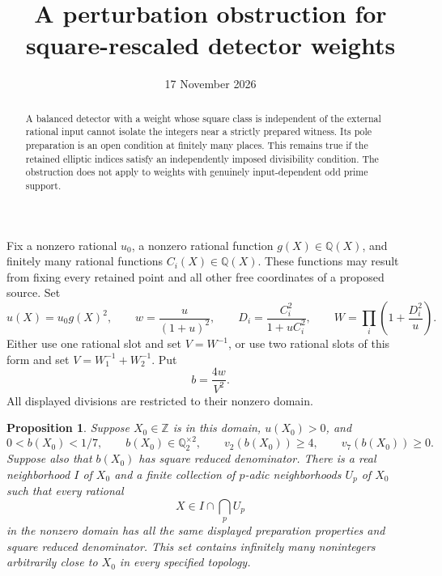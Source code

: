 \documentclass[11pt,a4paper]{article}
\title{A perturbation obstruction for square-rescaled detector weights}
\author{}\date{17 November 2026}
\newtheorem{proposition}{Proposition}
\newcommand{\Q}{\mathbb Q}
\newcommand{\Z}{\mathbb Z}
\begin{document}
\maketitle

\begin{abstract}
A balanced detector with a weight whose square class is independent of
the external rational input cannot isolate the integers near a strictly
prepared witness. Its pole preparation is an open condition at finitely
many places. This remains true if the retained elliptic indices satisfy
an independently imposed divisibility condition. The obstruction does
not apply to weights with genuinely input-dependent odd prime support.
\end{abstract}

Fix a nonzero rational $u_0$, a nonzero rational function
$g(X)\in\Q(X)$, and finitely many rational functions
$C_i(X)\in\Q(X)$. These functions may result from fixing every
retained point and all other free coordinates of a proposed source.
Set
\[
 u(X)=u_0g(X)^2,\qquad w=\frac{u}{(1+u)^2},\qquad
 D_i=\frac{C_i^2}{1+uC_i^2},\qquad
 W=\prod_i\left(1+\frac{D_i^2}{u}\right).
\]
Either use one rational slot and set $V=W^{-1}$, or use two rational
slots of this form and set $V=W_1^{-1}+W_2^{-1}$. Put
\[
                         b=\frac{4w}{V^2}.
\]
All displayed divisions are restricted to their nonzero domain.

\begin{proposition}\label{prop:open}
Suppose $X_0\in\Z$ is in this domain, $u(X_0)>0$, and
\[
 0<b(X_0)<1/7,\qquad b(X_0)\in\Q_2^{\times2},\qquad
 v_2(b(X_0))\ge4,\qquad v_7(b(X_0))\ge0.
\]
Suppose also that $b(X_0)$ has square reduced denominator.
There is a real neighborhood $I$ of $X_0$ and a finite collection
of $p$-adic neighborhoods $U_p$ of $X_0$ such that every rational
\[
                       X\in I\cap\bigcap_p U_p
\]
in the nonzero domain has all the same displayed preparation
properties and square reduced denominator. This set contains
infinitely many nonintegers arbitrarily close to $X_0$ in every
specified topology.
\end{proposition}
\end{document}
